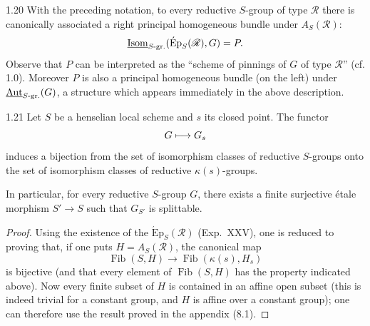 \begin{remark}{1.20}\label{XXIV.1.20}
With the preceding notation, to every reductive $S$-group of type $\mathscr R$ there is canonically associated a right principal homogeneous bundle under $A_S(\mathscr R)$:
\[
\underline{\operatorname{Isom}}_{S\text{-gr.}}(\operatorname{\acute Ep}_S(\mathscr R),G)=P.
\]
Observe that $P$ can be interpreted as the ``scheme of pinnings of $G$ of type $\mathscr R$'' (cf. 1.0). Moreover $P$ is also a principal homogeneous bundle (on the left) under $\underline{\operatorname{Aut}}_{S\text{-gr.}}(G)$, a structure which appears immediately in the above description.
\end{remark}
\begin{proposition}{1.21}\label{XXIV.1.21}
Let $S$ be a henselian local scheme and $s$ its closed point. The functor
\[
G\longmapsto G_s
\]
induces a bijection from the set of isomorphism classes of reductive $S$-groups onto the set of isomorphism classes of reductive $\kappa(s)$-groups.

In particular, for every reductive $S$-group $G$, there exists a finite surjective étale morphism $S'\to S$ such that $G_{S'}$ is splittable.
\end{proposition}
\begin{proof}
Using the existence of the $\operatorname{\acute Ep}_S(\mathscr R)$ (Exp.~XXV), one is reduced to proving that, if one puts $H=A_S(\mathscr R)$, the canonical map
\[
\operatorname{Fib}(S,H)\to\operatorname{Fib}(\kappa(s),H_s)
\]
is bijective (and that every element of $\operatorname{Fib}(S,H)$ has the property indicated above). Now every finite subset of $H$ is contained in an affine open subset (this is indeed trivial for a constant group, and $H$ is affine over a constant group); one can therefore use the result proved in the appendix (8.1).
\end{proof}

